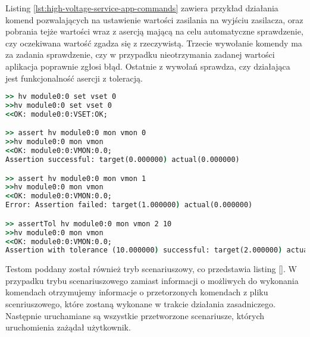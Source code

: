 Listing \ref{lst:high-voltage-service-app-commands} zawiera przykład działania komend pozwalających na ustawienie wartości zasilania na wyjściu zasilacza, oraz pobrania tejże wartości wraz z asercją mającą na celu automatyczne sprawdzenie, czy oczekiwana wartość zgadza się z rzeczywistą. Trzecie wywołanie komendy ma za zadania sprawdzenie, czy w przypadku nieotrzymania zadanej wartości aplikacja poprawnie zgłosi błąd. Ostatnie z wywołań sprawdza, czy działająca jest funkcjonalność asercji z toleracją.

\begin{lstlisting}[language=cmd,caption={Komendy wykonywane w trybie interaktywnym aplikacji \emph{high-voltage-service-app}},label={lst:high-voltage-service-app-commands},frame=single]
>> hv module0:0 set vset 0
>>hv module0:0 set vset 0
<<OK: module0:0:VSET:OK;

>> assert hv module0:0 mon vmon 0
>>hv module0:0 mon vmon
<<OK: module0:0:VMON:0.0;
Assertion successful: target(0.000000) actual(0.000000)

>> assert hv module0:0 mon vmon 1
>>hv module0:0 mon vmon
<<OK: module0:0:VMON:0.0;
Error: Assertion failed: target(1.000000) actual(0.000000)

>> assertTol hv module0:0 mon vmon 2 10
>>hv module0:0 mon vmon
<<OK: module0:0:VMON:0.0;
Assertion with tolerance (10.000000) successful: target(2.000000) actual(0.000000)
\end{lstlisting}

Testom poddany został również tryb scenariuszowy, co przedstawia listing \ref{}. W przypadku trybu scenariuszowego zamiast informacji o możliwych do wykonania komendach otrzymujemy informacje o przetorzonych komendach z pliku scenriuszowego, które zostaną wykonane w trakcie działania zasadniczego. Następnie uruchamiane są wszystkie przetworzone scenariusze, których uruchomienia zażądał użytkownik.

